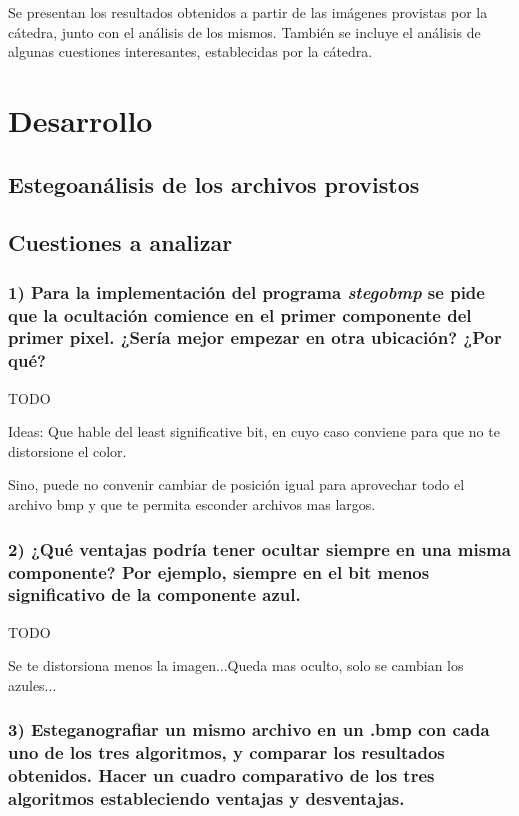 \documentclass[a4paper,10pt]{article}
\begin{document}
Se presentan los resultados obtenidos a partir de las imágenes provistas por la cátedra, junto con el análisis de los mismos.
También se incluye el análisis de algunas cuestiones interesantes, establecidas por la cátedra.

\section{Desarrollo}

\subsection{Estegoanálisis de los archivos provistos}

\subsection{Cuestiones a analizar}

\subsubsection*{ 1) Para la implementación del programa \textit{stegobmp} se pide que la ocultación comience en el
primer componente del primer pixel. ¿Sería mejor empezar en otra ubicación? ¿Por qué?}

TODO

Ideas: Que hable del least significative bit, en cuyo caso conviene para que no te distorsione el color.

Sino, puede no convenir cambiar de posición igual para aprovechar todo el archivo bmp y que te permita esconder archivos mas largos.

\subsubsection*{ 2) ¿Qué ventajas podría tener ocultar siempre en una misma componente? Por ejemplo, siempre
en el bit menos significativo de la componente azul.}

TODO

Se te distorsiona menos la imagen...Queda mas oculto, solo se cambian los azules...

\subsubsection*{ 3) Esteganografiar un mismo archivo en un .bmp con cada uno de los tres algoritmos, y comparar
los resultados obtenidos. Hacer un cuadro comparativo de los tres algoritmos estableciendo ventajas y desventajas.}
\end{document}
